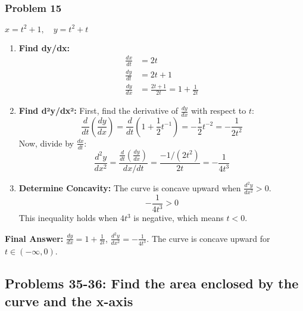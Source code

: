 \documentclass{article}
\begin{document}
\subsubsection{Problem 15}
$x = t^2 + 1, \quad y = t^2 + t$
\begin{enumerate}
    \item \textbf{Find dy/dx:}
    \begin{align*}
    \frac{dx}{dt} &= 2t \\
    \frac{dy}{dt} &= 2t + 1 \\
    \frac{dy}{dx} &= \frac{2t+1}{2t} = 1 + \frac{1}{2t}
    \end{align*}
    \item \textbf{Find d²y/dx²:}
    First, find the derivative of $\frac{dy}{dx}$ with respect to $t$:
    \[ \frac{d}{dt}\left(\frac{dy}{dx}\right) = \frac{d}{dt}\left(1 + \frac{1}{2}t^{-1}\right) = -\frac{1}{2}t^{-2} = -\frac{1}{2t^2} \]
    Now, divide by $\frac{dx}{dt}$:
    \[ \frac{d^2y}{dx^2} = \frac{\frac{d}{dt}\left(\frac{dy}{dx}\right)}{dx/dt} = \frac{-1/(2t^2)}{2t} = -\frac{1}{4t^3} \]
    \item \textbf{Determine Concavity:}
    The curve is concave upward when $\frac{d^2y}{dx^2} > 0$.
    \[ -\frac{1}{4t^3} > 0 \]
    This inequality holds when $4t^3$ is negative, which means $t < 0$.
\end{enumerate}
\textbf{Final Answer:} $\frac{dy}{dx} = 1 + \frac{1}{2t}$, $\frac{d^2y}{dx^2} = -\frac{1}{4t^3}$. The curve is concave upward for $t \in (-\infty, 0)$.


\subsection{Problems 35-36: Find the area enclosed by the curve and the x-axis}
\end{document}
